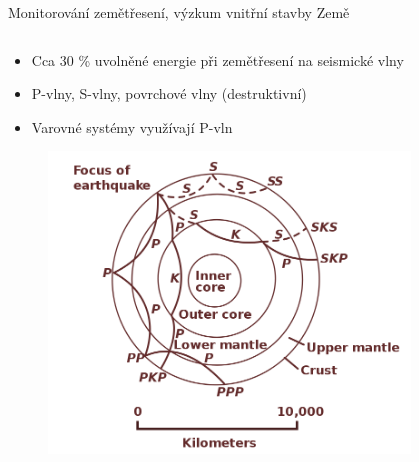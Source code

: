 \documentclass[10pt, notes]{beamer}
\begin{document}
\begin{frame}{Monitorování zemětřesení, výzkum vnitřní stavby Země}
    \begin{columns}
        \begin{column}{0.6\textwidth}
            \begin{itemize}
                \item Cca 30 \% uvolněné energie při zemětřesení na seismické vlny
                \item P-vlny, S-vlny, povrchové vlny (destruktivní)
                \item Varovné systémy využívají P-vln
            \end{itemize}
            \begin{figure}[h]
                \includegraphics[width=.65\textwidth]{wave_path.png}
            \end{figure}
        \end{column}
        \begin{column}{0.4\textwidth}
            \begin{figure}

\end{figure}
\end{column}
\end{columns}
\end{frame}
\end{document}
